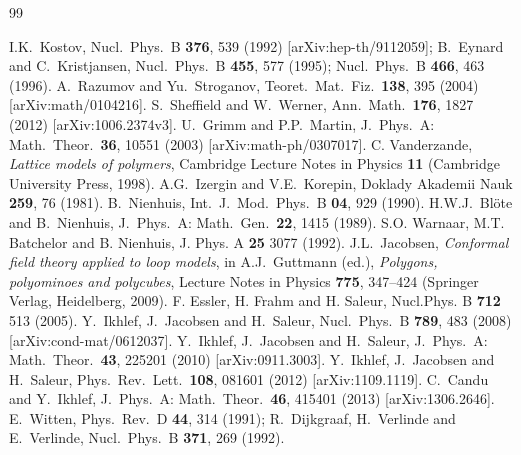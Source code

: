 \documentclass[11pt]{article}
\begin{document}
 
\begin{thebibliography}{99}

 I.K.\ Kostov,
Nucl.\ Phys.\ B {\bf 376}, 539 (1992) [arXiv:hep-th/9112059];
B.\ Eynard and C.\ Kristjansen,
Nucl.\ Phys.\ B {\bf 455}, 577 (1995);
Nucl.\ Phys.\ B {\bf 466}, 463 (1996).
 A.\ Razumov and Yu.\ Stroganov,
Teoret.\ Mat.\ Fiz.\ {\bf 138}, 395 (2004) [arXiv:math/0104216].
 S.\ Sheffield and W.\ Werner,
Ann.\ Math.\ {\bf 176}, 1827 (2012) [arXiv:1006.2374v3].
 U.\ Grimm and P.P.\ Martin,
J.\ Phys.\ A: Math.\ Theor.\ {\bf 36}, 10551 (2003) [arXiv:math-ph/0307017].
 C. Vanderzande,
{\em Lattice models of polymers}, Cambridge Lecture Notes in Physics {\bf 11} (Cambridge University Press, 1998).
  A.G.\ Izergin and V.E.\ Korepin,
 Doklady Akademii Nauk {\bf 259}, 76 (1981).
 B.\ Nienhuis, Int.\ J.\ Mod.\ Phys.\ B  {\bf 04}, 929 (1990).
 H.W.J.\ Bl\"ote and B.\ Nienhuis, J.\ Phys.\ A: Math.\ Gen.\ {\bf 22}, 1415 (1989).
 S.O. Warnaar, M.T. Batchelor and B. Nienhuis, J. Phys. A {\bf 25} 3077 (1992).
 J.L.\ Jacobsen,
{\em Conformal field theory applied to loop models}, in
 A.J.\ Guttmann (ed.), {\em Polygons, polyominoes and polycubes},
 Lecture Notes in Physics {\bf 775}, 347--424 (Springer Verlag, Heidelberg, 2009).
 F. Essler, H. Frahm and H. Saleur, Nucl.Phys. B {\bf 712} 513 (2005).
 Y.\ Ikhlef, J.\ Jacobsen and H.\ Saleur,
Nucl.\ Phys.\ B {\bf 789}, 483 (2008) [arXiv:cond-mat/0612037].
 Y.\ Ikhlef, J.\ Jacobsen and H.\ Saleur,
J.\ Phys.\ A: Math.\ Theor.\ {\bf 43}, 225201 (2010) [arXiv:0911.3003].
 Y.\ Ikhlef, J.\ Jacobsen and H.\ Saleur,
Phys.\ Rev.\ Lett.\ {\bf 108}, 081601 (2012) [arXiv:1109.1119].
 C.\ Candu and Y.\ Ikhlef,
 J.\ Phys.\ A: Math.\ Theor.\ {\bf 46}, 415401 (2013) [arXiv:1306.2646].
 E.\ Witten, Phys.\ Rev.\ D {\bf 44}, 314 (1991);
 R.\ Dijkgraaf, H.\ Verlinde and E.\ Verlinde, Nucl.\ Phys.\ B {\bf 371}, 269 (1992).

\end{thebibliography}
\end{document}
